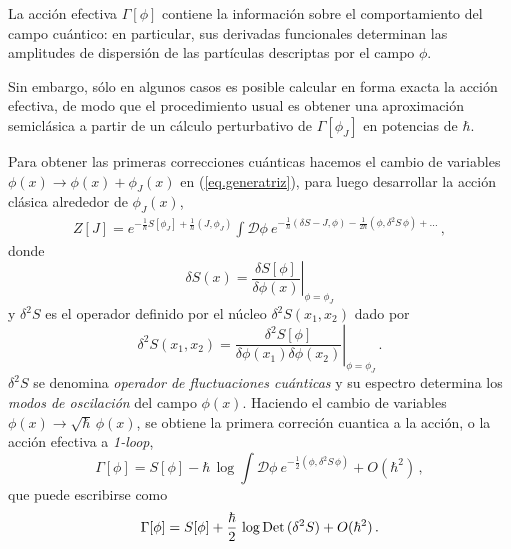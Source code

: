 La acción efectiva $\Gamma[\phi]$ contiene la información sobre el comportamiento del campo cuántico: en particular, sus derivadas funcionales determinan las amplitudes de dispersión de las partículas descriptas por el campo $\phi$.
\begin{comment}
Para demostrar esto se toma su derivada funcional evaluada en el campo medio $\phi _J $.
\begin{equation}
\frac{\delta \Gamma [ \phi _J ]}{\delta \phi _J (x) } = 
J(x) + \int dx ' \frac{\delta J [\phi _J ]}{\delta \phi _J (x) } \phi _J (x) - 
\frac{1}{Z[J]} \int dx' \frac{\delta Z[J] }{\delta J(x')} \frac{\delta J[\phi _J ]}{\delta \phi _J (x)} = J(x) \\[8pt]
\end{equation}
\end{comment}
Sin embargo, sólo en algunos casos es posible calcular en forma exacta la acción efectiva, de modo que el procedimiento usual es obtener una aproximación semiclásica a partir de un cálculo perturbativo de $\Gamma [ \phi _J]$ en potencias de $\hbar$.

Para obtener las primeras correcciones cuánticas hacemos el cambio de variables $\phi (x) \rightarrow \phi(x) + \phi _J (x) $ en (\ref{eq.generatriz}), para luego desarrollar la acción clásica alrededor de $\phi _J (x)$,
 \begin{equation}
\begin{array}{c}
Z[J] = e ^{- \frac{1}{\hbar} S[ \phi _J ] + \frac{1}{\hbar} (J, \phi _J )} 
\int \mathscr D \phi\ e ^{ - \frac{1}{\hbar} (\delta S  - J, \phi ) - \frac{1}{2 \hbar}  (\phi,\delta ^2 S\, \phi)+\ldots }\,,
\end{array}
\end{equation}
donde
\begin{equation}
\delta S(x) = \left. \frac{\delta S[\phi]}{ \delta \phi (x) } \right| _{\phi = \phi _J}
\end{equation}
y $\delta^2S$ es el operador definido por el núcleo $\delta ^2 S(x_1,x_2)$ dado por
\begin{equation}
		\delta ^2 S(x_1,x_2) = \left. \frac{\delta ^2 S[\phi]}{ \delta \phi (x_1) \delta \phi (x_2) } \right| _{\phi = \phi _J}\,.
\end{equation}
$\delta^2S$ se denomina {\it operador de fluctuaciones cuánticas} y su espectro determina los {\it modos de oscilación} del campo $\phi(x)$. Haciendo el cambio de variables $\phi (x) \rightarrow \sqrt{\hbar}\, \phi (x) $, se obtiene la primera correción cuantica a la  acción, o la acción efectiva a {\it 1-loop},
\begin{equation}
\Gamma [\phi] = S [ \phi] - 
\hbar\,\log\int \mathscr D \phi \ e ^{- \frac{1}{2}  (\phi, \delta ^2 S\, \phi) } + O(\hbar ^2)\,,
\end{equation}
que puede escribirse como
\begin{equation}\label{gama-det}
\Gamma [\phi] = S [\phi] + \frac{\hbar}{2}\, \log{\rm Det}\, ( \delta ^2 S ) +
O ( \hbar ^2 )\,.
\end{equation}

